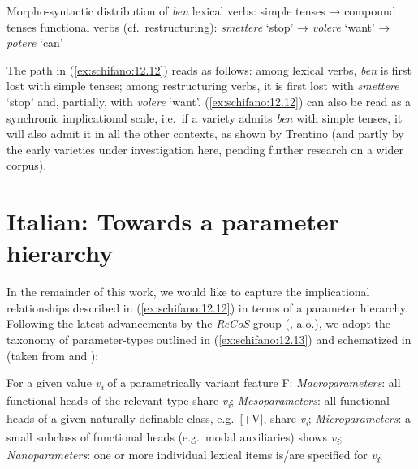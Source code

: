 \documentclass[output=paper]{langsci/langscibook}
\begin{document}
\ea\label{ex:schifano:12.12} Morpho-syntactic distribution of \emph{ben}
	\ea lexical verbs: simple tenses → compound tenses
    \ex functional verbs (cf.\ restructuring): \emph{smettere} ‘stop’ →
        \emph{volere} ‘want’ → \emph{potere} ‘can’
	\z
\z

The path in (\ref{ex:schifano:12.12}) reads as follows: among lexical verbs, \emph{ben} is first
lost with simple tenses; among restructuring verbs, it is first lost with
\emph{smettere} ‘stop’ and, partially, with \emph{volere} ‘want’. (\ref{ex:schifano:12.12}) can also
be read as a synchronic implicational scale, i.e.\ if a variety admits
\emph{ben} with simple tenses, it will also admit it in all the other contexts,
as shown by Trentino (and partly by the early varieties under investigation
here, pending further research on a wider corpus).

\section{Italian: Towards a parameter hierarchy}\label{sec:23-hierarchy}

In the remainder of this work, we would like to capture the implicational
relationships described in (\ref{ex:schifano:12.12}) in terms of a parameter hierarchy. Following
the latest advancements by the \emph{ReCoS} group
(\citealt{Roberts2012,BibRob2012,BibRob2015,BibRob2016,BibHolRobShee2014,BibRobShee2014},
a.o.), we adopt the taxonomy of parameter-types outlined in (\ref{ex:schifano:12.13}) and
schematized in  (taken from \citealt{BibRob2012} and
\citealt{BibRob2016}):

\ea\label{ex:schifano:12.13} For a given value \emph{v\textsubscript{i}} of a parametrically variant feature F:
	\ea \textit{Macroparameters}: all functional heads of the relevant type share \emph{v\textsubscript{i}};
	\ex \textit{Mesoparameters}: all functional heads of a given naturally definable class, e.g.\ [+V], share \emph{v\textsubscript{i}};
	\ex \textit{Microparameters}: a small subclass of functional heads (e.g.\ modal auxiliaries) shows \emph{v\textsubscript{i}};
	\ex \textit{Nanoparameters}: one or more individual lexical items is/are specified for \emph{v\textsubscript{i}};
	\z
\z
\end{document}
